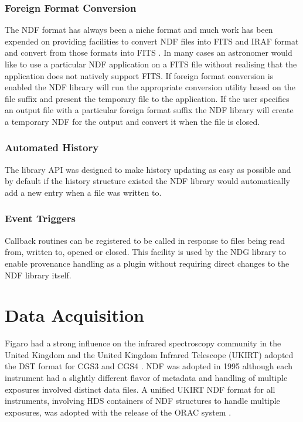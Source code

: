 \documentclass[final,authoryear,5p,times,twocolumn]{elsarticle}
\begin{document}
\subsubsection{Foreign Format Conversion}

The NDF format has always been a niche format and much work has been
expended on providing facilities to convert NDF files into FITS and
IRAF format and convert from those formats into FITS \citep{SUN55}. In
many cases an astronomer would like to use a particular NDF
application on a FITS file without realising that the application does
not natively support FITS. If foreign format conversion is enabled the
NDF library will run the appropriate conversion utility based on the
file suffix and present the temporary file to the application. If the
user specifies an output file with a particular foreign format suffix
the NDF library will create a temporary NDF for the output and convert
it when the file is closed.

\subsubsection{Automated History}

The library API was designed to make history updating as easy
as possible and by default if the history structure existed the NDF
library would automatically add a new entry when a file was written
to.

\subsubsection{Event Triggers}

Callback routines can be registered to be called in response to files
being read from, written to, opened or closed. This facility is used
by the NDG library \citep{SUN2} to enable provenance handling
as a plugin without requiring direct changes to the NDF library itself.

\section{Data Acquisition}

Figaro had a strong influence on the infrared spectroscopy community
in the United Kingdom and the United Kingdom Infrared Telescope
(UKIRT) adopted the DST format for CGS3 and CGS4 \citep{1993SPIE.1946..547W}. NDF was adopted in
1995 although each instrument had a slightly different flavor of
metadata and handling of multiple exposures involved distinct data
files. A unified UKIRT NDF format for all instruments, involving HDS
containers of NDF structures to handle multiple exposures, was
adopted with the release of the ORAC system \citep{2000SPIE.4009..227B}.
\end{document}
